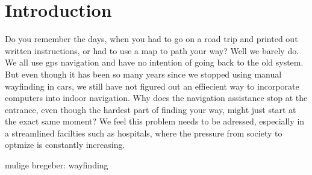 \chapter{Introduction}

Do you remember the days, when you had to go on a road trip and printed out written instructions, or had to use a map to path your way? Well we barely do. We all use gps navigation and have no intention of going back to the old system. But even though it has been so many years since we stopped using manual wayfinding in cars, we still have not figured out an effiecient way to incorporate computers into indoor navigation. Why does the navigation assistance stop at the entrance, even though the hardest part of finding your way, might just start at the exact same moment? We feel this problem needs to be adressed, especially in a streamlined facilties such as hospitals, where the pressure from society to optmize is constantly increasing.




mulige bregeber: wayfinding
